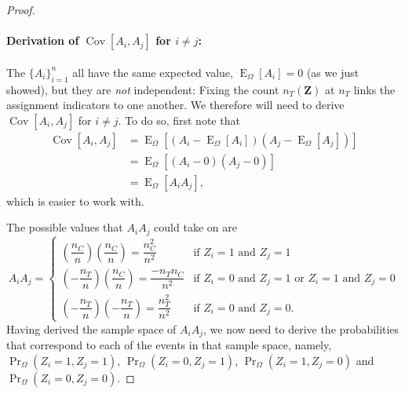 \documentclass[12pt,leqno]{article}
\theoremstyle{newstyle}
\DeclareMathOperator{\E}{\mathrm{E}}
\DeclareMathOperator{\Var}{\mathrm{Var}}
\DeclareMathOperator{\Cov}{\mathrm{Cov}}
\newcommand{\bZ}{\bm{Z}}   \newcommand{\bz}{\bm{z}}   %
\newcommand{\EZ}{\E_{\Omega}}    \newcommand{\VarZ}{\Var_{\Omega}}  %
\renewcommand{\Pr}{\operatorname{Pr}}
\begin{document}
\begin{proof}
\paragraph*{Derivation of $\Cov[A_i, A_j]$ for $i \neq j$:} The $\{A_i\}_{i = 1}^n$ all have the same expected value, $\EZ[A_i] = 0$ (as we just showed), but they are \textit{not} independent: Fixing the count $n_T(\bZ)$ at $n_T$ links the assignment indicators to one another. We therefore will need to derive $\Cov[A_i, A_j]$ for $i \neq j$. To do so, first note that
\small
\begin{align*}
\Cov\left[A_i, A_j\right] & = \EZ\left[\left(A_i - \EZ\left[A_i\right]\right)\left(A_j - \EZ\left[A_j\right]\right)\right] \\[1ex]
& = \EZ\left[\left(A_i - 0\right)\left(A_j - 0\right)\right] \\[1ex]
& = \EZ\left[A_i A_j\right],
\end{align*}
\normalsize
which is easier to work with.

The possible values that $A_i A_j$ could take on are 
\small
\begin{equation*}
A_i A_j = 
\begin{cases}
\left(\dfrac{n_C}{n}\right) \left(\dfrac{n_C}{n}\right) = \dfrac{n_C^2}{n^2} & \text{if } Z_i = 1 \text{ and } Z_j = 1 \\[1ex]
\left(-\dfrac{n_T}{n}\right) \left(\dfrac{n_C}{n}\right) = \dfrac{-n_T n_C}{n^2} & \text{if } Z_i = 0 \text{ and } Z_j = 1 \text{ or } Z_i = 1 \text{ and } Z_j = 0 \\[1ex] 
\left(-\dfrac{n_T}{n}\right) \left(-\dfrac{n_T}{n}\right) = \dfrac{n_T^2}{n^2} & \text{if } Z_i = 0 \text{ and } Z_j = 0.
\end{cases}
\end{equation*}
\normalsize
Having derived the sample space of $A_i A_j$, we now need to derive the probabilities that correspond to each of the events in that sample space, namely, $\Pr_{\Omega}(Z_i = 1, Z_j = 1)$, $\Pr_{\Omega}(Z_i = 0, Z_j = 1)$, $\Pr_{\Omega}(Z_i = 1, Z_j = 0)$ and $\Pr_{\Omega}(Z_i = 0, Z_j = 0)$.


\end{proof}
\end{document}
